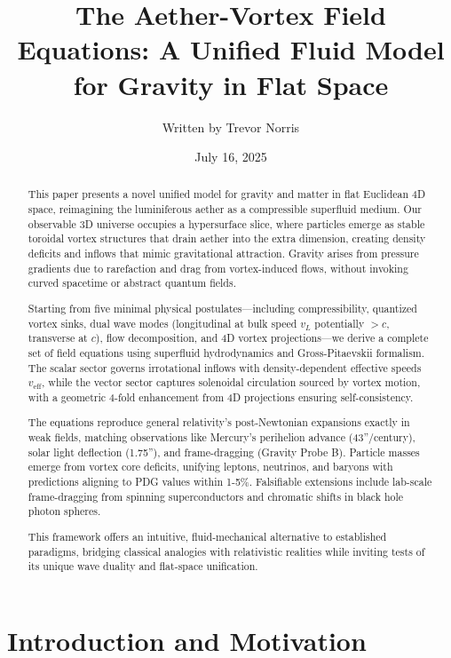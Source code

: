 \documentclass{article}
\title{The Aether-Vortex Field Equations: A Unified Fluid Model for Gravity in Flat Space}
\author{Written by Trevor Norris}
\date{July 16, 2025}
\begin{document}
\maketitle

\begin{abstract}
This paper presents a novel unified model for gravity and matter in flat Euclidean 4D space, reimagining the luminiferous aether as a compressible superfluid medium. Our observable 3D universe occupies a hypersurface slice, where particles emerge as stable toroidal vortex structures that drain aether into the extra dimension, creating density deficits and inflows that mimic gravitational attraction. Gravity arises from pressure gradients due to rarefaction and drag from vortex-induced flows, without invoking curved spacetime or abstract quantum fields.

Starting from five minimal physical postulates---including compressibility, quantized vortex sinks, dual wave modes (longitudinal at bulk speed $v_L$ potentially $>c$, transverse at $c$), flow decomposition, and 4D vortex projections---we derive a complete set of field equations using superfluid hydrodynamics and Gross-Pitaevskii formalism. The scalar sector governs irrotational inflows with density-dependent effective speeds $v_{\text{eff}}$, while the vector sector captures solenoidal circulation sourced by vortex motion, with a geometric 4-fold enhancement from 4D projections ensuring self-consistency.

The equations reproduce general relativity's post-Newtonian expansions exactly in weak fields, matching observations like Mercury's perihelion advance (43''/century), solar light deflection (1.75''), and frame-dragging (Gravity Probe B). Particle masses emerge from vortex core deficits, unifying leptons, neutrinos, and baryons with predictions aligning to PDG values within 1-5\%. Falsifiable extensions include lab-scale frame-dragging from spinning superconductors and chromatic shifts in black hole photon spheres.

This framework offers an intuitive, fluid-mechanical alternative to established paradigms, bridging classical analogies with relativistic realities while inviting tests of its unique wave duality and flat-space unification.
\end{abstract}

\section{Introduction and Motivation}
\end{document}
